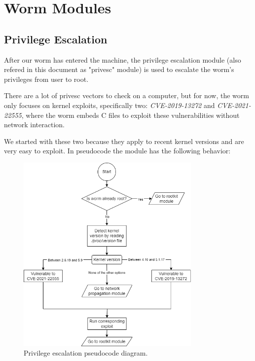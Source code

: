 \section{Worm Modules}

\subsection{Privilege Escalation}

After our worm has entered the machine, the privilege escalation module (also refered in this document as "privesc" module) is used to escalate the worm's privileges from user to root.

There are a lot of privesc vectors to check on a computer, but for now, the worm only focuses on kernel exploits, specifically two: \textit{CVE-2019-13272} and \textit{CVE-2021-22555}, where the worm embeds C files to exploit these vulnerabilities without network interaction.

We started with these two because they apply to recent kernel versions and are very easy to exploit. In pseudocode the module has the following behavior:

\begin{figure}[H]
    \centering
    \includegraphics[width=0.8\textwidth]{Images/Diagram.png}
    \caption{Privilege escalation pseudocode diagram.}
    \label{fig:priv_esc_pseudocode}
\end{figure}
\vspace{-0.5cm}

